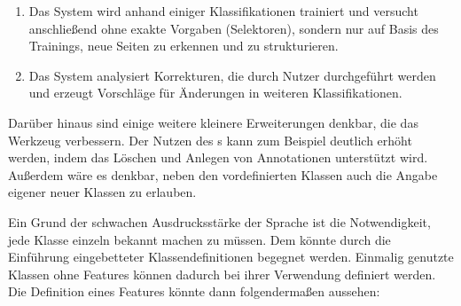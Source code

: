     \begin{enumerate}
        \item   Das System wird anhand einiger Klassifikationen trainiert
                und versucht anschließend ohne exakte Vorgaben (Selektoren),
                sondern nur auf Basis des Trainings,
                neue Seiten zu erkennen und zu strukturieren.
        \item   Das System analysiert Korrekturen, die durch Nutzer durchgeführt werden
                und erzeugt Vorschläge für Änderungen in weiteren Klassifikationen.
    \end{enumerate}

    Darüber hinaus sind einige weitere kleinere Erweiterungen denkbar,
    die das Werkzeug verbessern.
    Der Nutzen des {\annotatorPlugin}s kann zum Beispiel deutlich erhöht werden,
    indem das Löschen und Anlegen von Annotationen unterstützt wird.
    Außerdem wäre es denkbar, neben den vordefinierten Klassen auch
    die Angabe eigener neuer Klassen zu erlauben.

    Ein Grund der schwachen Ausdrucksstärke der Sprache ist die Notwendigkeit,
    jede Klasse einzeln bekannt machen zu müssen.
    Dem könnte durch die Einführung eingebetteter Klassendefinitionen begegnet werden.
    Einmalig genutzte Klassen ohne Features können dadurch bei ihrer Verwendung
    definiert werden.
    Die Definition eines Features könnte dann folgendermaßen aussehen:

    
